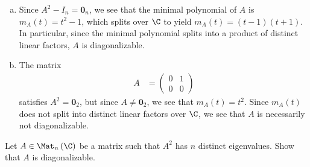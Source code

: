 \documentclass[10pt]{mypackage}
\begin{document}
\begin{solution}\hfill
  \begin{enumerate}[(a)]
    \item Since $A^2- I_n = \mathbf{0}_{n}$, we see that the minimal polynomial of $A$ is $m_A(t) = t^2 - 1$, which splits over $\C$ to yield $m_A(t) = \left( t-1 \right)\left( t+1 \right)$. In particular, since the minimal polynomial splits into a product of distinct linear factors, $A$ is diagonalizable.
    \item The matrix
      \begin{align*}
        A &= \begin{pmatrix}0 & 1 \\ 0 & 0\end{pmatrix}
      \end{align*}
      satisfies $A^2 = \mathbf{0}_{2}$, but since $A \neq \mathbf{0}_{2}$, we see that $m_{A}(t) = t^2$. Since $m_A(t)$ does not split into distinct linear factors over $\C$, we see that $A$ is necessarily not diagonalizable.
  \end{enumerate}
\end{solution}
\begin{problem}[Problem 8]
  Let $A\in \Mat_{n}\left( \C \right)$ be a matrix such that $A^2$ has $n$ distinct eigenvalues. Show that $A$ is diagonalizable.
\end{problem}
\end{document}

